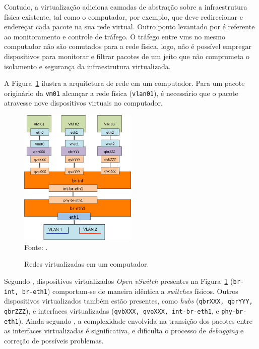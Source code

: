 Contudo, a virtualização adiciona camadas de abstração sobre a infraestrutura física existente, tal como o computador, por exemplo, que deve redirecionar e endereçar cada pacote na sua rede virtual. 
%
Outro ponto levantado por  é referente ao monitoramento e controle de tráfego.
%
O tráfego entre \acp{vm} no mesmo computador não são comutados para a rede física, logo, não é possível empregar dispositivos para monitorar e filtrar pacotes de um jeito que não comprometa o isolamento e segurança da infraestrutura virtualizada.

A Figura~\ref{fig:openstack_network_adapter} ilustra a arquitetura de rede em um computador. 
%
Para um pacote originário da \texttt{vm01} alcançar a rede física (\texttt{vlan01}), é necessário que o pacote atravesse nove dispositivos virtuais no computador.
%
\pagebreak
\begin{figure}[!htb]
	\centering
	\caption{Redes virtualizadas em um computador.}
    \vspace{-0.3cm}
	\includegraphics[width=0.5\textwidth]{img/openstack_virtualizacao.png}
	\label{fig:openstack_network_adapter}\\
    \vspace{-0.2cm}
	Fonte: \cite{zhang:2014:virtualizationtrafficanalysis}.
\end{figure}

Segundo , dispositivos virtualizados \textit{Open vSwitch} presentes na Figura~\ref{fig:openstack_network_adapter} (\texttt{br-int, br-eth1}) comportam-se de maneira idêntica a \textit{switches} físicos.
%
Outros dispositivos virtualizados também estão presentes, como \textit{hubs} (\texttt{qbrXXX, qbrYYY, qbrZZZ}), e interfaces virtualizadas (\texttt{qvbXXX, qvoXXX, int-br-eth1}, e \texttt{phy-br-eth1}).
%
Ainda segundo , a complexidade envolvida na transição dos pacotes entre as interfaces virtualizadas é significativa, e dificulta o processo de \textit{debugging} e correção de possíveis problemas.



